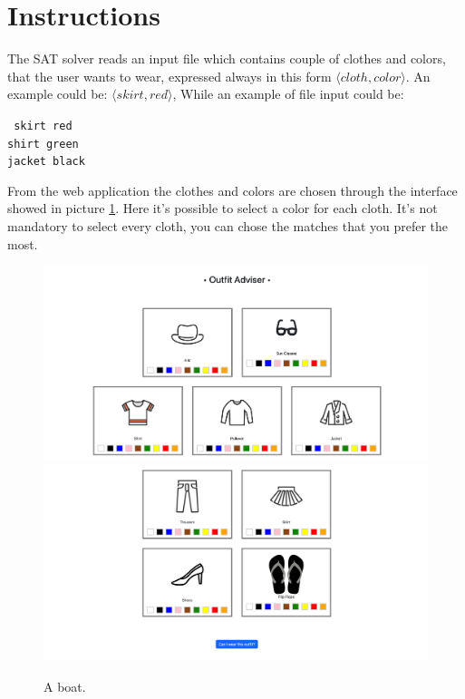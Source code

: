 \documentclass[12pt]{article}
\begin{document}
\section{Instructions}
The SAT solver reads an input file which contains couple of clothes and colors, that the user wants to wear, expressed always in this form $\langle cloth, color \rangle$. An example could be: $\langle skirt, red \rangle$, While an example of file input could be:

\begin{center}
    \texttt{
    skirt red\\
    shirt green\\
    jacket black}
    
\end{center}

From the web application the clothes and colors are chosen through the interface showed in picture \ref{boat1}. Here it's possible to select a color for each cloth. It's not mandatory to select every cloth, you can chose the matches that you prefer the most.

\begin{figure}
  \includegraphics[width=\linewidth]{1-interface.png}
  \includegraphics[width=\linewidth]{2-interface.png}
  \caption{A boat.}
  \label{boat1}
\end{figure}
\end{document}

